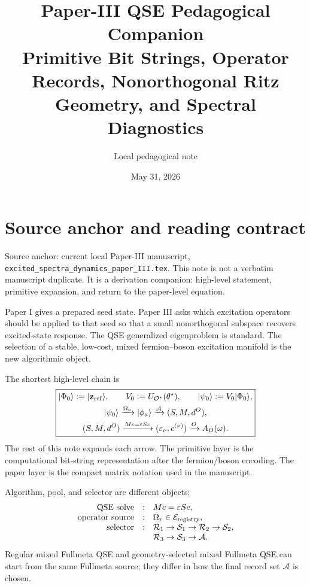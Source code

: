 \documentclass[10pt,twocolumn]{article}
\title{Paper-III QSE Pedagogical Companion\\[-1mm]
\large Primitive Bit Strings, Operator Records, Nonorthogonal Ritz Geometry, and Spectral Diagnostics}
\author{Local pedagogical note}
\date{May 31, 2026}
\newcommand{\Oset}{\mathcal O}
\newcommand{\Acal}{\mathcal A}
\newcommand{\Ecal}{\mathcal E}
\newcommand{\Rcal}{\mathcal R}
\newcommand{\Scal}{\mathcal S}
\newcommand{\ket}[1]{\lvert #1\rangle}
\begin{document}
\maketitle

\section{Source anchor and reading contract}

\begin{cautionbox}
Source anchor: current local Paper-III manuscript, \texttt{excited\_spectra\_dynamics\_paper\_III.tex}. This note is not a verbatim manuscript duplicate. It is a derivation companion: high-level statement, primitive expansion, and return to the paper-level equation.
\end{cautionbox}

\begin{intuitionbox}
Paper I gives a prepared seed state. Paper III asks which excitation operators should be applied to that seed so that a small nonorthogonal subspace recovers excited-state response. The QSE generalized eigenproblem is standard. The selection of a stable, low-cost, mixed fermion--boson excitation manifold is the new algorithmic object.
\end{intuitionbox}

The shortest high-level chain is
\begin{equation}
\boxed{
\begin{gathered}
\ket{\Phi_0}:=\ket{\mathbf z_{\rm ref}},
\qquad
V_0:=U_{\Oset^\star}(\theta^\star),
\qquad
\ket{\psi_0}:=V_0\ket{\Phi_0},\\
\ket{\psi_0}\xrightarrow{\Omega_a}\ket{\phi_a}
\xrightarrow{\Acal}(S,M,d^O),\\
(S,M,d^O)\xrightarrow{Mc=\varepsilon Sc}
(\varepsilon_\nu,c^{(\nu)})\xrightarrow{O}A_O(\omega).
\end{gathered}}
\label{eq:opening_chain}
\end{equation}
The rest of this note expands each arrow. The primitive layer is the computational bit-string representation after the fermion/boson encoding. The paper layer is the compact matrix notation used in the manuscript.

\begin{paperbox}
Algorithm, pool, and selector are different objects:
\[
\begin{array}{rcl}
\text{QSE solve} &:& Mc=\varepsilon Sc,\\
\text{operator source} &:& \Omega_r\in\Ecal_{\rm registry},\\
\text{selector} &:& \Rcal_1\to\Scal_1\to\Rcal_2\to\Scal_2,\\
&& \Rcal_3\to\Scal_3\to\Acal.
\end{array}
\]
Regular mixed Fullmeta QSE and geometry-selected mixed Fullmeta QSE can start from the same Fullmeta source; they differ in how the final record set \(\Acal\) is chosen.
\end{paperbox}
\end{document}
